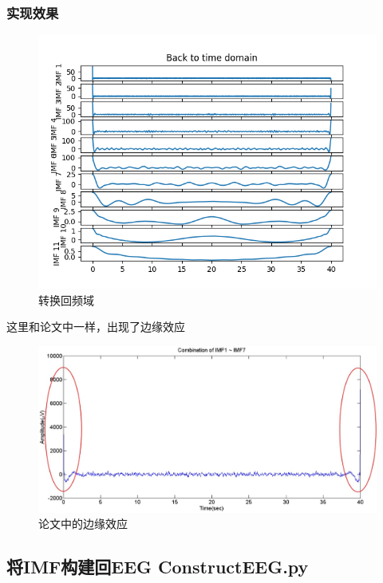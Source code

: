 \documentclass[cs4size,a4paper]{ctexart}
\numberwithin{equation}{section}
\numberwithin{table}{section}
\numberwithin{figure}{section}
\begin{document}
\subsubsection{实现效果}

\begin{figure}[H]
\small
\centering
\includegraphics{backtotimedomain.png}
\caption{转换回频域} \label{fig:backtotimedomain}
\end{figure}

这里和论文中一样，出现了边缘效应

\begin{figure}[H]
\small
\centering
\includegraphics[width=\textwidth]{edge.jpg}
\caption{论文中的边缘效应} \label{fig:edge}
\end{figure}

\subsection{将IMF构建回EEG ConstructEEG.py}
\end{document}
